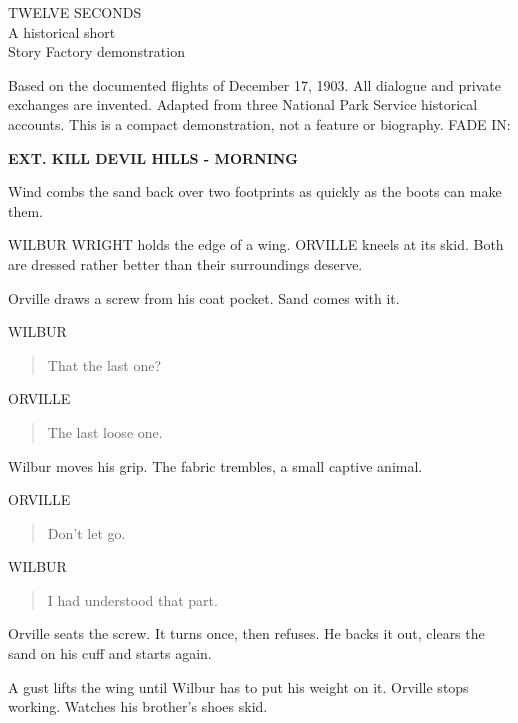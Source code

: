 \documentclass[12pt,letterpaper]{article}
\newcommand{\scene}[1]{\needspace{5\baselineskip}\vspace{8pt}\textbf{#1}\par}
\newcommand{\character}[1]{\needspace{4\baselineskip}\hspace*{2.2in}#1\par\nopagebreak}
\begin{document}
\thispagestyle{empty}
\vspace*{2in}\begin{center}TWELVE SECONDS\\[18pt]A historical short\\[18pt]Story Factory demonstration\end{center}
\vfill\small Based on the documented flights of December 17, 1903. All dialogue and private exchanges are invented. Adapted from three National Park Service historical accounts. This is a compact demonstration, not a feature or biography.\normalsize
\newpage\setcounter{page}{1}
FADE IN:\par
\scene{EXT. KILL DEVIL HILLS - MORNING}

Wind combs the sand back over two footprints as quickly as the boots can make them.\par

WILBUR WRIGHT holds the edge of a wing. ORVILLE kneels at its skid. Both are dressed rather better than their surroundings deserve.\par

Orville draws a screw from his coat pocket. Sand comes with it.\par

\character{WILBUR}
\begin{quote}That the last one?\par\end{quote}

\character{ORVILLE}
\begin{quote}The last loose one.\par\end{quote}

Wilbur moves his grip. The fabric trembles, a small captive animal.\par

\character{ORVILLE}
\begin{quote}Don't let go.\par\end{quote}

\character{WILBUR}
\begin{quote}I had understood that part.\par\end{quote}

Orville seats the screw. It turns once, then refuses. He backs it out, clears the sand on his cuff and starts again.\par

A gust lifts the wing until Wilbur has to put his weight on it. Orville stops working. Watches his brother's shoes skid.\par
\end{document}
